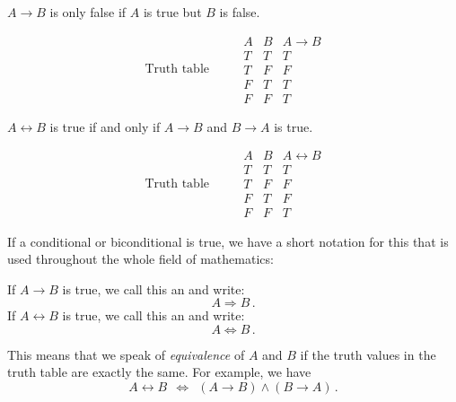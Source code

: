 

\begin{definition}
   $A \rightarrow B$ is only false if $A$ is true but $B$ is false.
\end{definition}
 
   \begin{equation}
   \mbox{ Truth table }\qquad 
    \begin{array}{cc|c}
     A & B & A \rightarrow B \\ \hline
     T & T& T\\
     T & F & F\\
     F & T & T\\
     F & F & T
    \end{array}
   \end{equation}


\begin{definition}
$A \leftrightarrow B$ is true if and only if $A \rightarrow B$ and $B \rightarrow A$ is true.
\end{definition}

   \begin{equation}
   \mbox{ Truth table }\qquad 
    \begin{array}{cc|c}
     A & B & A \leftrightarrow B \\ \hline
     T & T& T\\
     T & F & F\\
     F & T & F\\
     F & F & T
    \end{array}
   \end{equation}
   
If a conditional or biconditional is true,
we have a short notation for this that is used throughout   
the whole field of mathematics:
   
\begin{definition}
If $A \rightarrow B$ is true,
we call this an  and write:
	$$
	A \Rightarrow B  \,.
	$$
If $A \leftrightarrow B$ is true,
we call this an  and write:
	$$
	A \Leftrightarrow B  \,.
	$$
\end{definition}
 
This means that we speak of \emph{equivalence} of $A$ and $B$ if
the truth values in the truth table are exactly the same. For example, we have
	$$
		A \leftrightarrow B ~~ \Leftrightarrow
		~~
		(A \rightarrow B) \wedge (B \rightarrow A)
		\,.
	$$
 
